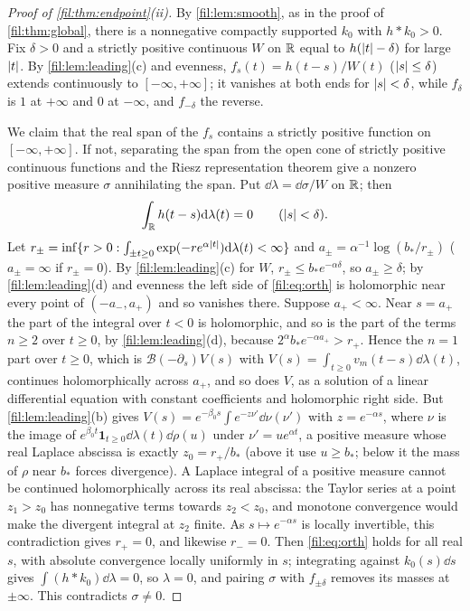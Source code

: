 \begin{proof}[Proof of \cref{fil:thm:endpoint}\textup{(ii)}]
By \cref{fil:lem:smooth}, as in the proof of \cref{fil:thm:global}, there is a nonnegative compactly supported
$k_0$ with $h*k_0>0$. Fix $\delta>0$ and a strictly positive continuous $W$ on $\mathbb{R}$ equal to $h(\lvert t\rvert-\delta)$
for large $\lvert t\rvert$. By \cref{fil:lem:leading}(c) and evenness, $f_s(t)=h(t-s)/W(t)$ ($\lvert s\rvert\le\delta$) extends
continuously to $[-\infty,+\infty]$; it vanishes at both ends for $\lvert s\rvert<\delta$, while $f_\delta$ is $1$ at $+\infty$ and
$0$ at $-\infty$, and $f_{-\delta}$ the reverse.

We claim that the real span of the $f_s$ contains a strictly positive function on $[-\infty,+\infty]$. If not,
separating the span from the open cone of strictly positive continuous functions and the Riesz representation
theorem give a nonzero positive measure $\sigma$ annihilating the span. Put $\dd\lambda=\dd\sigma/W$ on $\mathbb{R}$; then
\begin{equation}\label{fil:eq:orth}
 \int_{\mathbb{R}} h(t-s)\mathrm{d}\lambda(t)=0\qquad(\lvert s\rvert<\delta).
\end{equation}
Let $r_\pm=\inf\{r>0:\int_{\pm t\ge0}\exp(-re^{\alpha\lvert t\rvert})\mathrm{d}\lambda(t)<\infty\}$ and $a_\pm=\alpha^{-1}\log(b_*/r_\pm)$
($a_\pm=\infty$ if $r_\pm=0$). By \cref{fil:lem:leading}(c) for $W$, $r_\pm\le b_*e^{-\alpha\delta}$, so $a_\pm\ge\delta$; by
\cref{fil:lem:leading}(d) and evenness the left side of \eqref{fil:eq:orth} is holomorphic near every point of
$(-a_-,a_+)$ and so vanishes there. Suppose $a_+<\infty$. Near $s=a_+$ the part of the integral over $t<0$ is
holomorphic, and so is the part of the terms $n\ge2$ over $t\ge0$, by \cref{fil:lem:leading}(d), because
$2^\alpha b_*e^{-\alpha a_+}>r_+$. Hence the $n=1$ part over $t\ge0$, which is $\mathcal B(-\partial_s)V(s)$ with
$V(s)=\int_{t\ge0}v_m(t-s)\dd\lambda(t)$, continues holomorphically across $a_+$, and so does $V$, as a solution of a
linear differential equation with constant coefficients and holomorphic right side. But
\cref{fil:lem:leading}(b) gives $V(s)=e^{-\beta_0s}\int e^{-z\nu'}\dd\nu(\nu')$ with $z=e^{-\alpha s}$, where $\nu$ is the
image of $e^{\beta_0t}\mathbf1_{t\ge0}\dd\lambda(t)\dd\rho(u)$ under $\nu'=ue^{\alpha t}$, a positive measure whose real Laplace
abscissa is exactly $z_0=r_+/b_*$ (above it use $u\ge b_*$; below it the mass of $\rho$ near $b_*$ forces divergence).
A Laplace integral of a positive measure cannot be continued holomorphically across its real abscissa: the
Taylor series at a point $z_1>z_0$ has nonnegative terms towards $z_2<z_0$, and monotone convergence would
make the divergent integral at $z_2$ finite. As $s\mapsto e^{-\alpha s}$ is locally invertible, this contradiction
gives $r_+=0$, and likewise $r_-=0$. Then \eqref{fil:eq:orth} holds for all real $s$, with absolute convergence
locally uniformly in $s$; integrating against $k_0(s)\dd s$ gives $\int(h*k_0)\dd\lambda=0$, so $\lambda=0$, and pairing
$\sigma$ with $f_{\pm\delta}$ removes its masses at $\pm\infty$. This contradicts $\sigma\ne0$.


\end{proof}
